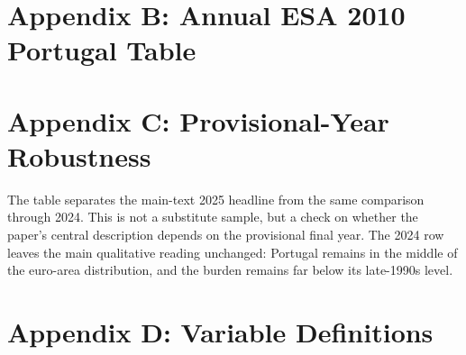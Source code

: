 \documentclass[11pt,a4paper]{article}
\begin{document}


\section{Appendix B: Annual ESA 2010 Portugal Table}



\section{Appendix C: Provisional-Year Robustness}



The table separates the main-text 2025 headline from the same comparison
through 2024. This is not a substitute sample, but a check on whether the
paper's central description depends on the provisional final year. The 2024
row leaves the main qualitative reading unchanged: Portugal remains in the
middle of the euro-area distribution, and the burden remains far below its
late-1990s level.

\section{Appendix D: Variable Definitions}
\end{document}
